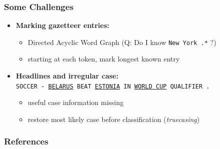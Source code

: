 \documentclass[10pt]{beamer}
\begin{document}


\begin{frame}
\frametitle{Some Challenges}

\begin{itemize}
	\item \textbf{Marking gazetteer entries:}\\
	\begin{itemize}
		\item Directed Acyclic Word Graph (Q: Do I know \texttt{New York .*} ?)
		\item starting at each token, mark longest known entry
	\end{itemize}

 \item \textbf{Headlines and irregular case:}\\\vspace{0.2cm}
\texttt{SOCCER - \underline{BELARUS} BEAT \underline{ESTONIA} IN \underline{WORLD CUP} QUALIFIER .}\vspace{0.1cm}
	\begin{itemize}
		\item useful case information missing
		\item restore most likely case before classification (\emph{truecasing})
	\end{itemize} 
	
\end{itemize} 
\end{frame}












\begin{frame}[allowframebreaks]
        \frametitle{References}
        \nocite{*}
        
        
\end{frame}
\end{document}
